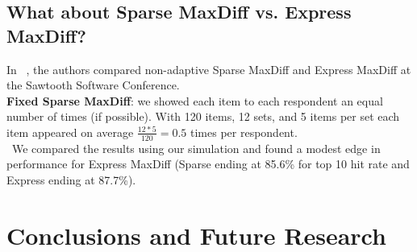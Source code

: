 \documentclass[a4paper,12pt]{article}
\begin{document}


\subsection{What about Sparse MaxDiff vs. Express MaxDiff?}
In ~\cite{wirth2012largeset}, the authors compared non-adaptive Sparse MaxDiff and Express MaxDiff at the Sawtooth Software Conference.\\
\textbf{Fixed Sparse MaxDiff}: we showed each item to each respondent an equal number of times (if possible).  With 120 items, 12 sets, and 5 items per set each item appeared on average $\frac{12*5}{120} = 0.5$ times per respondent. \\
 We compared the results using our simulation and found a modest edge in performance for Express MaxDiff (Sparse ending at 85.6\% for top 10 hit rate and Express ending at 87.7\%).

\section{Conclusions and Future Research}
\end{document}
